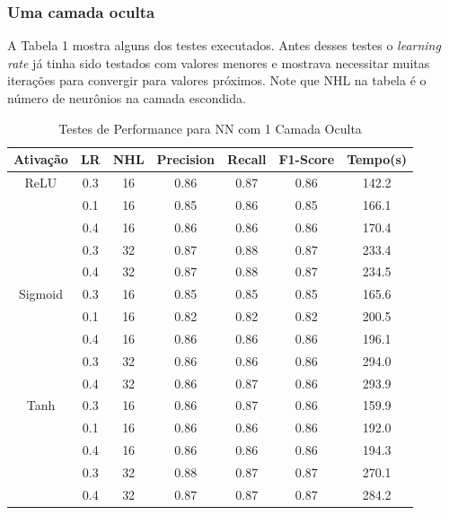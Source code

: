 \documentclass[conference]{IEEEtran}
\begin{document}
\subsubsection{Uma camada oculta}
	
	A Tabela 1 mostra alguns dos testes executados. Antes desses testes o \textit{learning rate} já tinha sido testados com valores menores e mostrava necessitar muitas iterações para convergir para valores próximos. Note que NHL na tabela é o número de neurônios na camada escondida.
	
\begin{table}[h!]
 \begin{center}
  \caption{Testes de Performance para NN com 1 Camada Oculta}
  \label{table:table1}
  \begin{tabular}{ |c|c|c|c|c|c|c| }
   \hline
   Ativação & LR & NHL & Precision & Recall & F1-Score & Tempo(s)\\
   \hline
   ReLU & 0.3 & 16 & 0.86 & 0.87 & 0.86 & 142.2 \\ 
                   & 0.1 & 16 & 0.85 & 0.86 & 0.85 & 166.1 \\
                   & 0.4 & 16 & 0.86 & 0.86 & 0.86 & 170.4 \\
                   & 0.3 & 32 & 0.87 & 0.88 & 0.87 & 233.4 \\
                   & 0.4 & 32 & 0.87 & 0.88 & 0.87 & 234.5 \\
   \hline
   Sigmoid & 0.3 & 16 & 0.85 & 0.85 & 0.85 & 165.6 \\ 
                     & 0.1 & 16 & 0.82 & 0.82 & 0.82 & 200.5 \\
                     & 0.4 & 16 & 0.86 & 0.86 & 0.86 & 196.1 \\
                     & 0.3 & 32 & 0.86 & 0.86 & 0.86 & 294.0 \\
                     & 0.4 & 32 & 0.86 & 0.87 & 0.86 & 293.9 \\	
   \hline
   Tanh & 0.3 & 16 & 0.86 & 0.87 & 0.86 & 159.9 \\ 
                     & 0.1 & 16 & 0.86 & 0.86 & 0.86 & 192.0 \\
                     & 0.4 & 16 & 0.86 & 0.86 & 0.86 & 194.3 \\
                     & 0.3 & 32 & 0.88 & 0.87 & 0.87 & 270.1 \\
                     & 0.4 & 32 & 0.87 & 0.87 & 0.87 & 284.2 \\

 \hline
 \end{tabular}
 \end{center}
\end{table}
\end{document}
